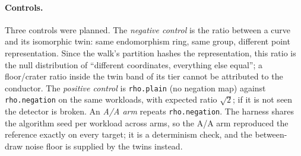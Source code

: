 \documentclass[10pt,a4paper]{article}
\newcommand{\artefact}[1]{\texttt{\small #1}}
\theoremstyle{remark}
\begin{document}
\begin{table}[t]
\centering\footnotesize
{}
\caption{Families. Tier S curves are the Sage-verified pairs of
\artefact{crypto:research/conductor\_gap\_cm\_pairs\_20261010}; tier M
parameters are new and are built and certified inside the session by the
harness's native constructor; tier L pairs are entries 0--23 of
\artefact{crypto:research/conductor\_gap\_cm\_orbits\_20261015/inputs/pairs.json}.
``Twins'' are isomorphic models $(a u^4, b u^6)$ with generator
$(u^2 x, u^3 y)$, $u = 3$ (tiers S, L) or $u = 5$ (twin round).
Solve counts include every arm.}
\label{tab:families}
\end{table}

\paragraph{Controls.}
Three controls were planned. The \emph{negative control} is the ratio
between a curve and its isomorphic twin: same endomorphism ring, same
group, different point representation. Since the walk's partition hashes
the representation, this ratio is the null distribution of ``different
coordinates, everything else equal''; a floor/crater ratio inside the
twin band of its tier cannot be attributed to the conductor. The
\emph{positive control} is \texttt{rho.plain} (no negation map) against
\texttt{rho.negation} on the same workloads, with expected ratio
$\sqrt2$; if it is not seen the detector is broken. An \emph{A/A arm}
repeats \texttt{rho.negation}. The harness shares the algorithm seed per
workload across arms, so the A/A arm reproduced the reference exactly on
every target; it is a determinism check, and the between-draw noise floor
is supplied by the twins instead.
\end{document}
